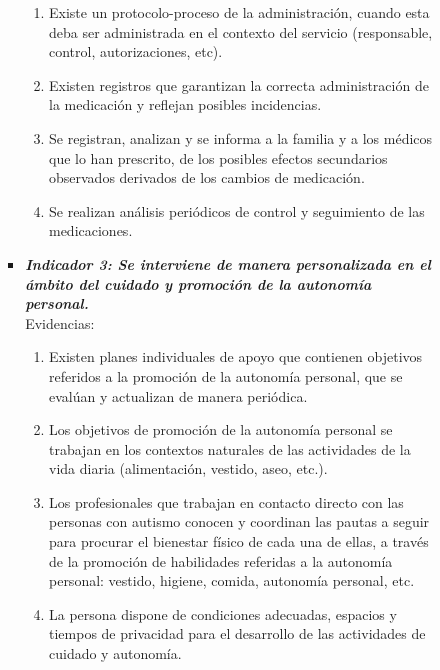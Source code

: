 \begin{itemize}
\begin{itemize}
\begin{itemize}
\begin{itemize}
				\begin{enumerate}
					\item Existe un protocolo-proceso de la administración, cuando esta deba ser administrada en el contexto del servicio (responsable, control, autorizaciones, etc). 
					\item Existen registros que garantizan la correcta administración de la medicación y reflejan posibles incidencias. 
					\item Se registran, analizan y se informa a la familia y a los médicos que lo han prescrito, de los posibles efectos secundarios observados derivados de los cambios de medicación. 
					\item Se realizan análisis periódicos de control y seguimiento de las medicaciones.
				\end{enumerate}
				\item \textbf{\textit{Indicador 3: Se interviene de manera personalizada en el ámbito del cuidado y promoción de la autonomía personal.}}\\Evidencias:
				\begin{enumerate}
					\item Existen planes individuales de apoyo que contienen objetivos referidos a la promoción de la autonomía personal, que se evalúan y actualizan de manera periódica.  
					\item Los objetivos de promoción de la autonomía personal se trabajan en los contextos naturales de las actividades de la vida diaria (alimentación, vestido, aseo, etc.).
					\item Los profesionales que trabajan en contacto directo con las personas con autismo conocen y coordinan las pautas a seguir para procurar el bienestar físico de cada una de ellas, a través de la promoción de habilidades referidas a la autonomía personal: vestido, higiene, comida, autonomía personal, etc. 
					\item La persona dispone de condiciones adecuadas, espacios y tiempos de privacidad para el desarrollo de las actividades de cuidado y autonomía. 
					 

\end{enumerate}
\end{itemize}
\end{itemize}
\end{itemize}
\end{itemize}
